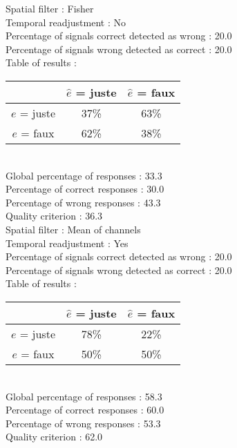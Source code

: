 Spatial filter : Fisher \\
Temporal readjustment : No \\
Percentage of signals correct detected as wrong :   20.0 \\
Percentage of signals wrong detected as correct :   20.0 \\
Table of results : \\
\begin{tabular}{|c|c|c|}
\hline				& $\hat{e}$ = juste & $\hat{e}$ = faux \\
\hline  $e$ = juste	&     37\%			&     63\%		\\
\hline  $e$ = faux	&     62\%			&     38\%		\\
\hline
\end{tabular}\\
Global percentage of responses :   33.3 \\
Percentage of correct responses :   30.0 \\
Percentage of wrong responses :   43.3 \\
Quality criterion :   36.3 \\

Spatial filter : Mean of channels \\
Temporal readjustment : Yes \\
Percentage of signals correct detected as wrong :   20.0 \\
Percentage of signals wrong detected as correct :   20.0 \\
Table of results : \\
\begin{tabular}{|c|c|c|}
\hline				& $\hat{e}$ = juste & $\hat{e}$ = faux \\
\hline  $e$ = juste	&     78\%			&     22\%		\\
\hline  $e$ = faux	&     50\%			&     50\%		\\
\hline
\end{tabular}\\
Global percentage of responses :   58.3 \\
Percentage of correct responses :   60.0 \\
Percentage of wrong responses :   53.3 \\
Quality criterion :   62.0 \\

